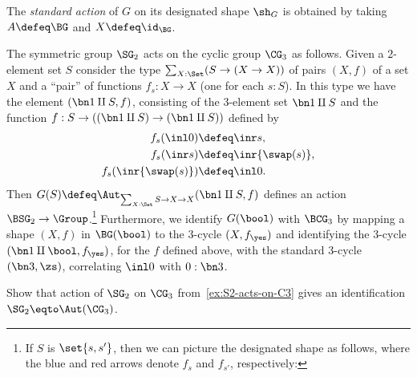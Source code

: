 \begin{definition}\label{std-action}
  The \emph{standard action} of $G$ on its designated shape $\sh_G$ is obtained by
  taking $A \defeq \BG$ and $X \defeq \id_{\BG}$.
\end{definition}

\begin{example}\label{ex:S2-acts-on-C3}
  The symmetric group $\SG_2$ acts on the cyclic group $\CG_3$ as follows.
  Given a $2$-element set $S$ consider the
  type $\sum_{X:\Set}(S \to (X\to X))$ of pairs $(X,f)$ of a set $X$
  and a ``pair'' of functions $f_s:X\to X$ (one for each $s:S$).
  In this type we have the element $(\bn 1 \amalg S,f)$,
  consisting of the $3$-element set $\bn 1 \amalg S$ and the function
  $f:S \to ((\bn 1 \amalg S)\to (\bn 1 \amalg S))$ defined by
  \begin{align*}
    f_s(\inl 0)     &\defeq \inr s,\\
    f_s(\inr s)        &\defeq \inr{\swap(s)},\\
    f_s(\inr{\swap(s)}) &\defeq \inl 0.
  \end{align*}
  Then $G(S) \defeq \Aut_{\sum_{X:\Set}S\to X\to X}(\bn1\amalg S,f)$ defines an action
  $\BSG_2 \to \Group$.\footnote{%
    If $S$ is $\set{s,s'}$, then we can picture the
    designated shape as follows,
    where the blue and red arrows denote $f_s$ and $f_{s'}$,
    respectively:\par
    }
  Furthermore, we identify $G(\bool)$ with $\BCG_3$ by mapping
  a shape $(X,f)$ in $\BG(\bool)$ to the $3$-cycle $(X,f_\yes)$
  and identifying the $3$-cycle $(\bn1\amalg\bool,f_\yes)$, for the $f$ defined above,
  with the standard $3$-cycle $(\bn3,\zs)$, correlating $\inl 0$ with $0:\bn 3$.
\end{example}
\begin{xca}\label{xca:AutC3}
  Show that action of $\SG_2$ on $\CG_3$ from~\cref{ex:S2-acts-on-C3}
  gives an identification $\SG_2 \eqto \Aut(\CG_3)$.
\end{xca}

